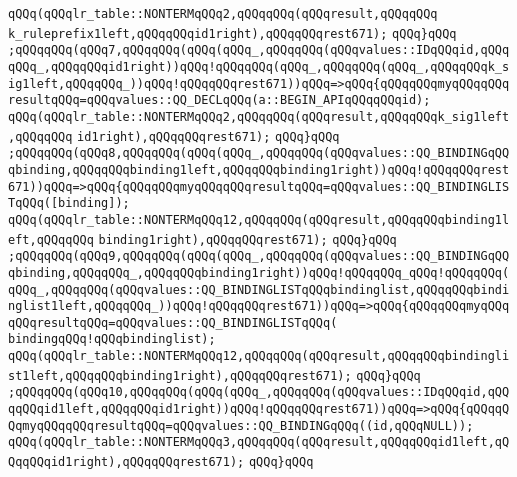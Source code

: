 \verb|qQQq(qQQqlr_table::NONTERMqQQq2,qQQqqQQq(qQQqresult,qQQqqQQq|\newline
\verb|k_ruleprefix1left,qQQqqQQqid1right),qQQqqQQqrest671);|\newline
\verb|qQQq}qQQq|\newline
\verb|;qQQqqQQq(qQQq7,qQQqqQQq(qQQq(qQQq_,qQQqqQQq(qQQqvalues::IDqQQqid,qQQqqQQq_,qQQqqQQqid1right))qQQq!qQQqqQQq(qQQq_,qQQqqQQq(qQQq_,qQQqqQQqk_sig1left,qQQqqQQq_))qQQq!qQQqqQQqrest671))qQQq=>qQQq{qQQqqQQqmyqQQqqQQqresultqQQq=qQQqvalues::QQ_DECLqQQq(a::BEGIN_APIqQQqqQQqid);|\newline
\verb|qQQq(qQQqlr_table::NONTERMqQQq2,qQQqqQQq(qQQqresult,qQQqqQQqk_sig1left,qQQqqQQq|\newline
\verb|id1right),qQQqqQQqrest671);|\newline
\verb|qQQq}qQQq|\newline
\verb|;qQQqqQQq(qQQq8,qQQqqQQq(qQQq(qQQq_,qQQqqQQq(qQQqvalues::QQ_BINDINGqQQqbinding,qQQqqQQqbinding1left,qQQqqQQqbinding1right))qQQq!qQQqqQQqrest671))qQQq=>qQQq{qQQqqQQqmyqQQqqQQqresultqQQq=qQQqvalues::QQ_BINDINGLISTqQQq([binding]);|\newline
\verb|qQQq(qQQqlr_table::NONTERMqQQq12,qQQqqQQq(qQQqresult,qQQqqQQqbinding1left,qQQqqQQq|\newline
\verb|binding1right),qQQqqQQqrest671);|\newline
\verb|qQQq}qQQq|\newline
\verb|;qQQqqQQq(qQQq9,qQQqqQQq(qQQq(qQQq_,qQQqqQQq(qQQqvalues::QQ_BINDINGqQQqbinding,qQQqqQQq_,qQQqqQQqbinding1right))qQQq!qQQqqQQq_qQQq!qQQqqQQq(qQQq_,qQQqqQQq(qQQqvalues::QQ_BINDINGLISTqQQqbindinglist,qQQqqQQqbindinglist1left,qQQqqQQq_))qQQq!qQQqqQQqrest671))qQQq=>qQQq{qQQqqQQqmyqQQqqQQqresultqQQq=qQQqvalues::QQ_BINDINGLISTqQQq(|\newline
\verb|bindingqQQq!qQQqbindinglist);|\newline
\verb|qQQq(qQQqlr_table::NONTERMqQQq12,qQQqqQQq(qQQqresult,qQQqqQQqbindinglist1left,qQQqqQQqbinding1right),qQQqqQQqrest671);|\newline
\verb|qQQq}qQQq|\newline
\verb|;qQQqqQQq(qQQq10,qQQqqQQq(qQQq(qQQq_,qQQqqQQq(qQQqvalues::IDqQQqid,qQQqqQQqid1left,qQQqqQQqid1right))qQQq!qQQqqQQqrest671))qQQq=>qQQq{qQQqqQQqmyqQQqqQQqresultqQQq=qQQqvalues::QQ_BINDINGqQQq((id,qQQqNULL));|\newline
\verb|qQQq(qQQqlr_table::NONTERMqQQq3,qQQqqQQq(qQQqresult,qQQqqQQqid1left,qQQqqQQqid1right),qQQqqQQqrest671);|\newline
\verb|qQQq}qQQq|\newline
